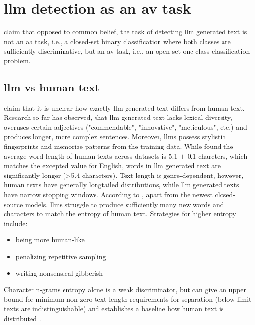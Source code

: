 \section{\ac{llm} detection as an \ac{av} task}
\label{sec:llm_detection_av}

\citet{llm_detection_av_2025} claim that opposed to common belief, the task of detecting \ac{llm} generated text is not an \ac{aa} task,
i.e., a closed-set binary classification where both classes are sufficiently discriminative, 
but an \ac{av} task, i.e., an open-set one-class classification problem. 

\subsection{\ac{llm} vs human text}

\citet{llm_detection_av_2025} claim that it is unclear how exactly \ac{llm} generated text differs from human text.
Research so far has observed, that \ac{llm} generated text lacks lexical diversity, 
overuses certain adjectives ("commendable", "innovative", "meticulous", etc.) and produces longer, more complex sentences.
Moreover, \acp{llm} possess stylistic fingerprints and memorize patterns from the training data.
While \citet{llm_detection_av_2025} found the average word length of human texts across datasets is 5.1 $\pm$ 0.1 charcters, 
which matches the excepted value for English, 
words in \ac{llm} generated text are significantly longer (>5.4 characters).
Text length is genre-dependent, however, human texts have generally longtailed distributions, 
while \ac{llm} generated texts have narrow stopping windows. 
According to \citet{llm_detection_av_2025}, apart from the newest closed-source models, 
\acp{llm} struggle to produce sufficiently many new words and characters to match the entropy of human text.
Strategies for higher entropy include:
\begin{itemize}
    \item being more human-like
    \item penalizing repetitive sampling
    \item writing nonsensical gibberish
\end{itemize}
Character n-grams entropy alone is a weak discriminator, 
but can give an upper bound for minimum non-zero text length requirements for separation (below limit texts are indistinguishable) and 
establishes a baseline how human text is distributed \cite{llm_detection_av_2025}.

